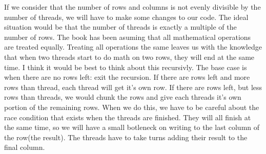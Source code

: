 \documentclass{article}
\begin{document}
If we consider that the number of rows and columns is not evenly divisible by the number of threads, we will
have to make some changes to our code.
The ideal situation would be that the number of threads is exactly a multiple of the number of rows.
The book has been asuming that all mathematical operations are treated equally. Treating all operations the
same leaves us with the knowledge that when two threads start to do math on two rows, they will end at the 
same time. I think it would be best to think about this recursivly. The base case is when there are no rows left: 
exit the recursion. If there are rows left and more rows than thread, each thread will get it's own row.
If there are rows left, but less rows than threads, we would chunk the rows and give each threads it's
own portion of the remaining rows. When we do this, we have to be careful about the race condition that 
exists when the threads are finished. They will all finish at the same time, so we will have a small 
botleneck on writing to the last column of the row(the result). The threads have to take turns adding 
their result to the final column. 

\lstset{language=C,
	xleftmargin=16pt,
        framextopmargin=6pt,
        framexbottommargin=6pt, 
        frame=tb, framerule=0pt,}
\end{document}
